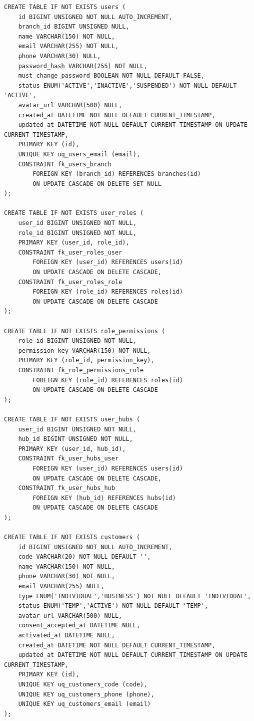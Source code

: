 \documentclass[11pt,a4paper]{article}
\begin{document}
\begin{lstlisting}
CREATE TABLE IF NOT EXISTS users (
    id BIGINT UNSIGNED NOT NULL AUTO_INCREMENT,
    branch_id BIGINT UNSIGNED NULL,
    name VARCHAR(150) NOT NULL,
    email VARCHAR(255) NOT NULL,
    phone VARCHAR(30) NULL,
    password_hash VARCHAR(255) NOT NULL,
    must_change_password BOOLEAN NOT NULL DEFAULT FALSE,
    status ENUM('ACTIVE','INACTIVE','SUSPENDED') NOT NULL DEFAULT 'ACTIVE',
    avatar_url VARCHAR(500) NULL,
    created_at DATETIME NOT NULL DEFAULT CURRENT_TIMESTAMP,
    updated_at DATETIME NOT NULL DEFAULT CURRENT_TIMESTAMP ON UPDATE CURRENT_TIMESTAMP,
    PRIMARY KEY (id),
    UNIQUE KEY uq_users_email (email),
    CONSTRAINT fk_users_branch
        FOREIGN KEY (branch_id) REFERENCES branches(id)
        ON UPDATE CASCADE ON DELETE SET NULL
);

CREATE TABLE IF NOT EXISTS user_roles (
    user_id BIGINT UNSIGNED NOT NULL,
    role_id BIGINT UNSIGNED NOT NULL,
    PRIMARY KEY (user_id, role_id),
    CONSTRAINT fk_user_roles_user
        FOREIGN KEY (user_id) REFERENCES users(id)
        ON UPDATE CASCADE ON DELETE CASCADE,
    CONSTRAINT fk_user_roles_role
        FOREIGN KEY (role_id) REFERENCES roles(id)
        ON UPDATE CASCADE ON DELETE CASCADE
);

CREATE TABLE IF NOT EXISTS role_permissions (
    role_id BIGINT UNSIGNED NOT NULL,
    permission_key VARCHAR(150) NOT NULL,
    PRIMARY KEY (role_id, permission_key),
    CONSTRAINT fk_role_permissions_role
        FOREIGN KEY (role_id) REFERENCES roles(id)
        ON UPDATE CASCADE ON DELETE CASCADE
);

CREATE TABLE IF NOT EXISTS user_hubs (
    user_id BIGINT UNSIGNED NOT NULL,
    hub_id BIGINT UNSIGNED NOT NULL,
    PRIMARY KEY (user_id, hub_id),
    CONSTRAINT fk_user_hubs_user
        FOREIGN KEY (user_id) REFERENCES users(id)
        ON UPDATE CASCADE ON DELETE CASCADE,
    CONSTRAINT fk_user_hubs_hub
        FOREIGN KEY (hub_id) REFERENCES hubs(id)
        ON UPDATE CASCADE ON DELETE CASCADE
);

CREATE TABLE IF NOT EXISTS customers (
    id BIGINT UNSIGNED NOT NULL AUTO_INCREMENT,
    code VARCHAR(20) NOT NULL DEFAULT '',
    name VARCHAR(150) NOT NULL,
    phone VARCHAR(30) NOT NULL,
    email VARCHAR(255) NULL,
    type ENUM('INDIVIDUAL','BUSINESS') NOT NULL DEFAULT 'INDIVIDUAL',
    status ENUM('TEMP','ACTIVE') NOT NULL DEFAULT 'TEMP',
    avatar_url VARCHAR(500) NULL,
    consent_accepted_at DATETIME NULL,
    activated_at DATETIME NULL,
    created_at DATETIME NOT NULL DEFAULT CURRENT_TIMESTAMP,
    updated_at DATETIME NOT NULL DEFAULT CURRENT_TIMESTAMP ON UPDATE CURRENT_TIMESTAMP,
    PRIMARY KEY (id),
    UNIQUE KEY uq_customers_code (code),
    UNIQUE KEY uq_customers_phone (phone),
    UNIQUE KEY uq_customers_email (email)
);


\end{lstlisting}
\end{document}
